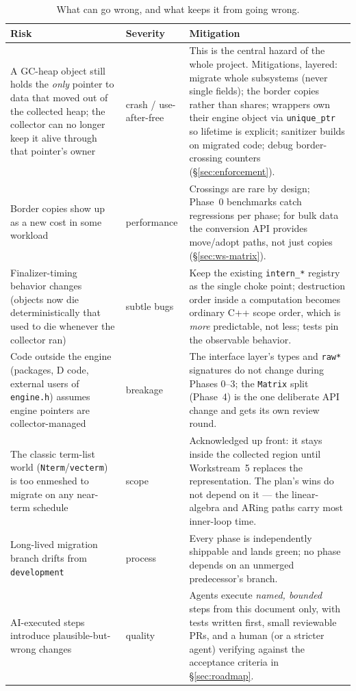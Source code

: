 \documentclass[11pt,oneside]{report}
\newcommand{\code}[1]{\textcolor{m2code}{\texttt{#1}}}
\newcommand{\file}[1]{\textcolor{m2file}{\texttt{#1}}}
\begin{document}
\begin{table}[htbp]
\centering\small
\begin{tabular}{@{}p{}p{}p{}@{}}
\toprule
\textbf{Risk} & \textbf{Severity} & \textbf{Mitigation} \\
\midrule
A GC-heap object still holds the \emph{only} pointer to data that moved out
of the collected heap; the collector can no longer keep it alive through
that pointer's owner &
crash / use-after-free &
This is the central hazard of the whole project. Mitigations, layered:
migrate whole subsystems (never single fields); the border copies rather
than shares; wrappers own their engine object via \code{unique\_ptr} so
lifetime is explicit; sanitizer builds on migrated code; debug
border-crossing counters (\S\ref{sec:enforcement}). \\
\addlinespace
Border copies show up as a new cost in some workload &
performance &
Crossings are rare by design; Phase~0 benchmarks catch regressions per
phase; for bulk data the conversion API provides move/adopt paths, not just
copies (\S\ref{sec:ws-matrix}). \\
\addlinespace
Finalizer-timing behavior changes (objects now die deterministically that
used to die whenever the collector ran) &
subtle bugs &
Keep the existing \code{intern\_*} registry as the single choke point;
destruction order inside a computation becomes ordinary C++ scope order,
which is \emph{more} predictable, not less; tests pin the observable
behavior. \\
\addlinespace
Code outside the engine (packages, D code, external users of
\file{engine.h}) assumes engine pointers are collector-managed &
breakage &
The interface layer's types and \code{raw*} signatures do not change during
Phases 0--3; the \code{Matrix} split (Phase~4) is the one deliberate API
change and gets its own review round. \\
\addlinespace
The classic term-list world (\code{Nterm}/\code{vecterm}) is too enmeshed to
migrate on any near-term schedule &
scope &
Acknowledged up front: it stays inside the collected region until
Workstream~5 replaces the representation. The plan's wins do not depend on
it --- the linear-algebra and ARing paths carry most inner-loop time. \\
\addlinespace
Long-lived migration branch drifts from \code{development} &
process &
Every phase is independently shippable and lands green; no phase depends on
an unmerged predecessor's branch. \\
\addlinespace
AI-executed steps introduce plausible-but-wrong changes &
quality &
Agents execute \emph{named, bounded} steps from this document only, with
tests written first, small reviewable PRs, and a human (or a stricter
agent) verifying against the acceptance criteria in \S\ref{sec:roadmap}. \\
\bottomrule
\end{tabular}
\caption{What can go wrong, and what keeps it from going wrong.}
\label{tab:risks}
\end{table}
\end{document}
